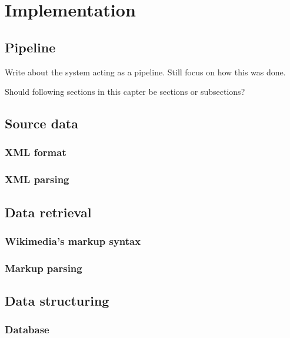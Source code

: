 
\chapter{Implementation}

\section{Pipeline}

Write about the system acting as a pipeline.
Still focus on how this was done.

Should following sections in this capter be sections or subsections?

\section{Source data}


\subsection{XML format}


\subsection{XML parsing}


\section{Data retrieval}

\subsection{Wikimedia's markup syntax}

\subsection{Markup parsing}


\section{Data structuring}

\subsection{Database}

